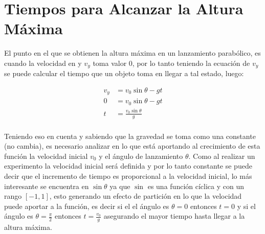 \section{Tiempos para Alcanzar la Altura Máxima}
\label{sec:tiempor_para_alcanzar_la_altura_maxima}

El punto en el que se obtienen la altura máxima en un lanzamiento parabólico,
es cuando la velocidad en y \(v_y\) toma valor  \(0\), por lo tanto teniendo la
ecuación de \(v_y\) se puede calcular el tiempo que un objeto toma en llegar a
tal estado, luego:

\begin{align*}
    v_y &=  v_0\sin\theta -gt \\
    0 &=  v_0\sin\theta -gt \\
    t &= \frac{v_0\sin\theta}{g} \\
\end{align*}

Teniendo eso en cuenta y sabiendo que la gravedad se toma como una constante
(no cambia), es necesario analizar en lo que está aportando al crecimiento de
esta función la velocidad inicial \(v_0\) y el ángulo de lanzamiento
\(\theta\). Como al realizar un experimento la velocidad inicial será definida
y por lo tanto constante se puede decir que el incremento de tiempo es
proporcional a la velocidad inicial, lo más interesante se encuentra en
\(\sin\theta\) ya que \(\sin\) es una función cíclica y con un rango
\(\left[-1, 1\right] \), esto generando un efecto de partición en lo que la
velocidad puede aportar a la función, es decir si el el ángulo es \(\theta =0\)
entonces  \(t=0\) y si el ángulo es \(\theta = \frac{\pi}{2}\) entonces
\(t=\frac{v_0}{g}\) asegurando el mayor tiempo hasta
llegar a la altura máxima.
